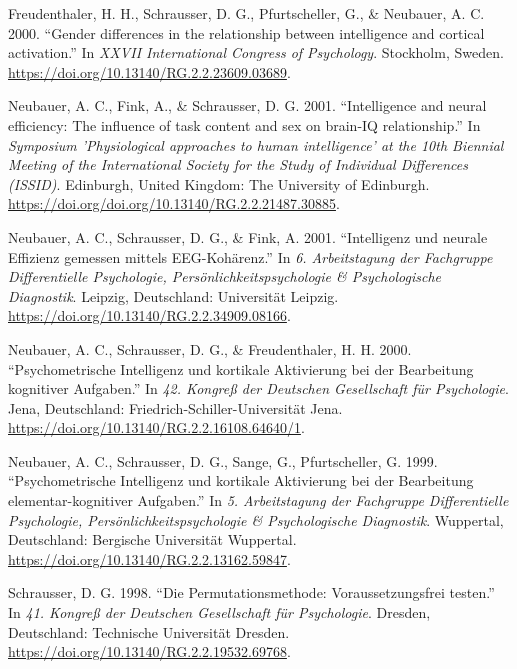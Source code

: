 \documentclass[
]{article}
\author{}
\date{}
\newlength{\cslhangindent}
\newlength{\cslentryspacingunit} %
\newenvironment{CSLReferences}[2] %
 {%
  \setlength{\parindent}{0pt}
  \ifodd #1
  \let\oldpar\par
  \def\par{\hangindent=\cslhangindent\oldpar}
  \fi
  \setlength{\parskip}{#2\cslentryspacingunit}
 }%
 {}
\begin{document}
\hypertarget{refs}{}
\begin{CSLReferences}{1}{0}
\leavevmode{}%
Freudenthaler, H. H., Schrausser, D. G., Pfurtscheller, G., \& Neubauer,
A. C. 2000. {``{Gender differences in the relationship between
intelligence and cortical activation}.''} In \emph{{XXVII International
Congress of Psychology}}. Stockholm, Sweden.
\url{https://doi.org/10.13140/RG.2.2.23609.03689}.

\leavevmode{}%
Neubauer, A. C., Fink, A., \& Schrausser, D. G. 2001. {``{Intelligence
and neural efficiency: The influence of task content and sex on brain-IQ
relationship}.''} In \emph{{Symposium 'Physiological approaches to human
intelligence' at the 10th Biennial Meeting of the International Society
for the Study of Individual Differences (ISSID)}}. Edinburgh, United
Kingdom: {The University of Edinburgh}.
\url{https://doi.org/doi.org/10.13140/RG.2.2.21487.30885}.

\leavevmode{}%
Neubauer, A. C., Schrausser, D. G., \& Fink, A. 2001. {``{Intelligenz
und neurale Effizienz gemessen mittels EEG-Kohärenz}.''} In \emph{{6.
Arbeitstagung der Fachgruppe Differentielle Psychologie,
Persönlichkeitspsychologie \& Psychologische Diagnostik}}. Leipzig,
Deutschland: {Universität Leipzig}.
\url{https://doi.org/10.13140/RG.2.2.34909.08166}.

\leavevmode{}%
Neubauer, A. C., Schrausser, D. G., \& Freudenthaler, H. H. 2000.
{``{Psychometrische Intelligenz und kortikale Aktivierung bei der
Bearbeitung kognitiver Aufgaben}.''} In \emph{{42. Kongreß der Deutschen
Gesellschaft für Psychologie}}. Jena, Deutschland:
{Friedrich-Schiller-Universität Jena}.
\url{https://doi.org/10.13140/RG.2.2.16108.64640/1}.

\leavevmode{}%
Neubauer, A. C., Schrausser, D. G., Sange, G., Pfurtscheller, G. 1999.
{``{Psychometrische Intelligenz und kortikale Aktivierung bei der
Bearbeitung elementar-kognitiver Aufgaben}.''} In \emph{{5.
Arbeitstagung der Fachgruppe Differentielle Psychologie,
Persönlichkeitspsychologie \& Psychologische Diagnostik}}. Wuppertal,
Deutschland: {Bergische Universität Wuppertal}.
\url{https://doi.org/10.13140/RG.2.2.13162.59847}.

\leavevmode{}%
Schrausser, D. G. 1998. {``{Die Permutationsmethode: Voraussetzungsfrei
testen}.''} In \emph{{41. Kongreß der Deutschen Gesellschaft für
Psychologie}}. Dresden, Deutschland: {Technische Universität Dresden}.
\url{https://doi.org/10.13140/RG.2.2.19532.69768}.


\end{CSLReferences}
\end{document}
